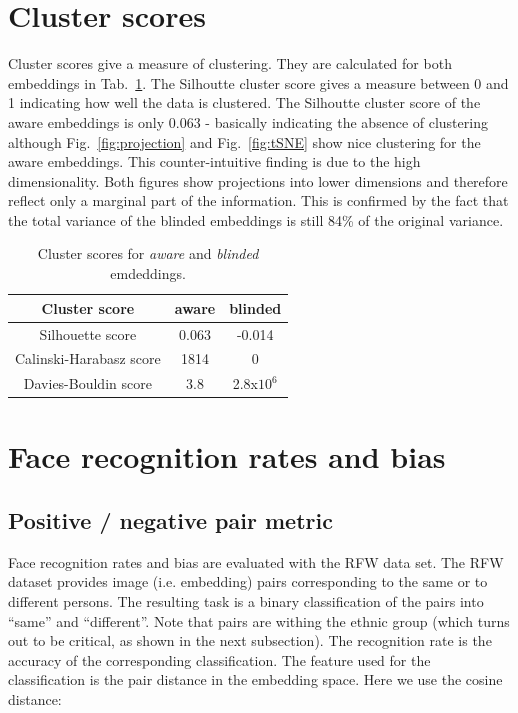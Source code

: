 \documentclass{report}
\begin{document}
\section{Cluster scores}

Cluster scores give a measure of clustering. They are calculated for both embeddings in Tab.~\ref{tab:cluster}. The Silhoutte cluster score gives a measure between 0 and 1 indicating how well the data is clustered. The Silhoutte cluster score of the aware embeddings is only 0.063 -  basically indicating the absence of clustering although Fig.~\ref{fig:projection} and Fig.~\ref{fig:tSNE} show nice clustering for the aware embeddings. This counter-intuitive finding is due to the high dimensionality. Both figures show projections into lower dimensions and therefore reflect only a marginal part of the information. This is confirmed by the fact that the total variance of the blinded embeddings is still 84\% of the original variance.   

\begin{table}
\begin{center}
\begin{tabular}{ c|c|c }
Cluster score & aware  & blinded  \\
\hline
Silhouette score & 0.063 & -0.014 \\ 
Calinski-Harabasz score & 1814 & 0 \\  
Davies-Bouldin score & 3.8 & 2.8x$10^6$  
\end{tabular}
\end{center}
\caption{Cluster scores for  \emph{aware}  and  \emph{blinded} emdeddings.}
\label{tab:cluster}
\end{table}

\section{Face recognition rates and bias}

\subsection{Positive / negative pair metric}

Face recognition rates and bias are evaluated with the RFW data set. The RFW dataset provides image (i.e. embedding) pairs corresponding to the same or to different persons. The resulting task is a binary classification of the pairs into ``same'' and ``different''. Note that pairs are withing the ethnic group (which turns out to be critical, as shown in the next subsection). The recognition rate is the accuracy of the corresponding classification. The feature used for the classification is the pair distance in the embedding space. Here we use the cosine distance:
\end{document}
